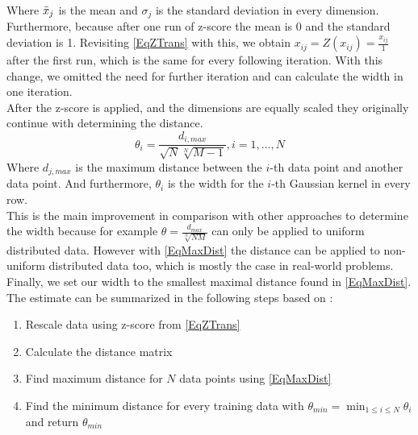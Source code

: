Where $\bar{x}_j$ is the mean and $\sigma_j$ is the standard deviation in every dimension.\\
Furthermore, because after one run of z-score the mean is 0 and the standard deviation is 1.\cite{Mohamad.2013}
Revisiting \eqref{EqZTrans} with this, we obtain $x_{ij} = Z(x_{ij}) = \frac{x_{ij}}{1}$ after the first run, which is the same for every following iteration.
With this change, we omitted the need for further iteration and can calculate the width in one iteration.\\
After the z-score is applied, and the dimensions are equally scaled they originally continue with determining the distance.\cite{Kitayama.2011}
\begin{equation}\label{EqMaxDist}
	\theta_i = \frac{d_{i,max}}{\sqrt{N}\sqrt[N]{M-1}}, i=1,\dots,N
\end{equation}
Where $d_{j,max}$ is the maximum distance between the $i$-th data point and another data point.
And furthermore, $\theta_i$ is the width for the $i$-th Gaussian kernel in every row.\\
This is the main improvement in comparison with other approaches to determine the width because for example $\theta =\frac{d_{max}}{\sqrt[N]{NM}}$ can only be applied to uniform distributed data.
However with \eqref{EqMaxDist} the distance can be applied to non-uniform distributed data too, which is mostly the case in real-world problems.\cite{Kitayama.2011}\newline
Finally, we set our width to the smallest maximal distance found in \eqref{EqMaxDist}.
The estimate can be summarized in the following steps based on \cite{Kitayama.2011}:
\begin{enumerate}[label=\bfseries Step \arabic*:,leftmargin=*,labelindent=1em]
	\item Rescale data using z-score from \eqref{EqZTrans}
	\item Calculate the distance matrix
	\item Find maximum distance for $N$ data points using \eqref{EqMaxDist}
	\item Find the minimum distance for every training data with $\displaystyle\theta_{min}=\min_{1 \le i \le N}\theta_i$ and return $\theta_{min}$
\end{enumerate}
